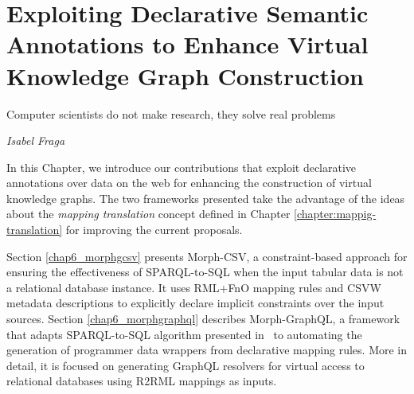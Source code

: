 
\chapter{Exploiting Declarative Semantic Annotations to Enhance Virtual Knowledge Graph Construction}
\label{chapter:virtual}
\epigraph{Computer scientists do not make research, they solve real problems}{\textit{Isabel Fraga}}

In this Chapter, we introduce our contributions that exploit declarative annotations over data on the web for enhancing the construction of virtual knowledge graphs. The two frameworks presented take the advantage of the ideas about the \textit{mapping translation} concept defined in Chapter \ref{chapter:mappig-translation} for improving the current proposals. 

Section \ref{chap6_morphgcsv} presents Morph-CSV, a constraint-based approach for ensuring the effectiveness of SPARQL-to-SQL when the input tabular data is not a relational database instance. It uses RML+FnO mapping rules and CSVW metadata descriptions to explicitly declare implicit constraints over the input sources. Section \ref{chap6_morphgraphql} describes Morph-GraphQL, a framework that adapts SPARQL-to-SQL algorithm presented in~\citep{chebotko2009semantics} to automating the generation of programmer data wrappers from declarative mapping rules. More in detail, it is focused on generating GraphQL resolvers for virtual access to relational databases using R2RML mappings as inputs.



